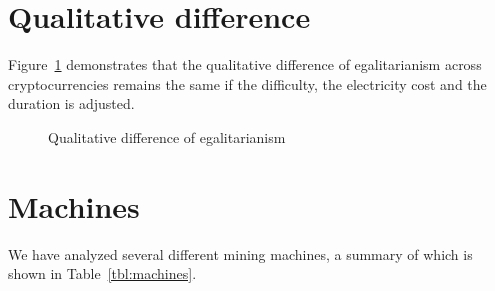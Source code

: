 \appendix
\section{Qualitative difference}\label{sec:appendix-qualitative-difference}

Figure~\ref{fig:different-settings} demonstrates that the qualitative difference of egalitarianism across cryptocurrencies remains the same if the difficulty, the electricity cost and the duration is adjusted.

\begin{figure}[!ht]
  \caption{Qualitative difference of egalitarianism}
  \label{fig:different-settings}
\end{figure}

\section{Machines}\label{sec:appendix-data}

We have analyzed several different mining machines, a summary of which is shown in Table~\ref{tbl:machines}.


